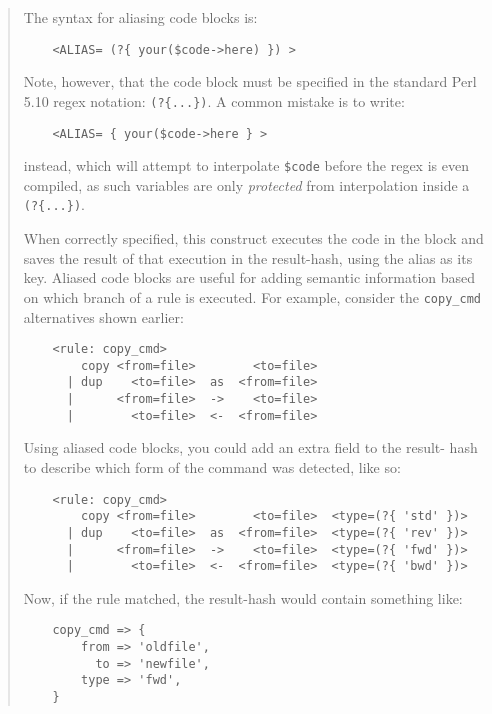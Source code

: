 
\begin{it}\begin{quotation}
The syntax for aliasing code blocks is:

\begin{verbatim}
    <ALIAS= (?{ your($code->here) }) >
\end{verbatim}

Note, however, that the code block must be specified in the standard
Perl 5.10 regex notation: \verb|(?{...})|. A common mistake is to write:

\begin{verbatim}
    <ALIAS= { your($code->here } >
\end{verbatim}

instead, which will attempt to interpolate \verb|$code| before the
regex is even compiled, as such variables are only \emph{protected} from
interpolation inside a \verb|(?{...})|.

When correctly specified, this construct executes the code in the block
and saves the result of that execution in the result-hash, using the
alias as its key. Aliased code blocks are useful for adding semantic
information based on which branch of a rule is executed. For example,
consider the \verb|copy_cmd| alternatives shown earlier:

\begin{verbatim}
    <rule: copy_cmd>
        copy <from=file>        <to=file>
      | dup    <to=file>  as  <from=file>
      |      <from=file>  ->    <to=file>
      |        <to=file>  <-  <from=file>
\end{verbatim}

Using aliased code blocks, you could add an extra field to the result-
hash to describe which form of the command was detected, like so:

\begin{verbatim}
    <rule: copy_cmd>
        copy <from=file>        <to=file>  <type=(?{ 'std' })> 
      | dup    <to=file>  as  <from=file>  <type=(?{ 'rev' })> 
      |      <from=file>  ->    <to=file>  <type=(?{ 'fwd' })> 
      |        <to=file>  <-  <from=file>  <type=(?{ 'bwd' })> 
\end{verbatim}

Now, if the rule matched, the result-hash would contain something like:

\begin{verbatim}
    copy_cmd => {
        from => 'oldfile',
          to => 'newfile',
        type => 'fwd',
    }
\end{verbatim}
\end{quotation}\end{it}

